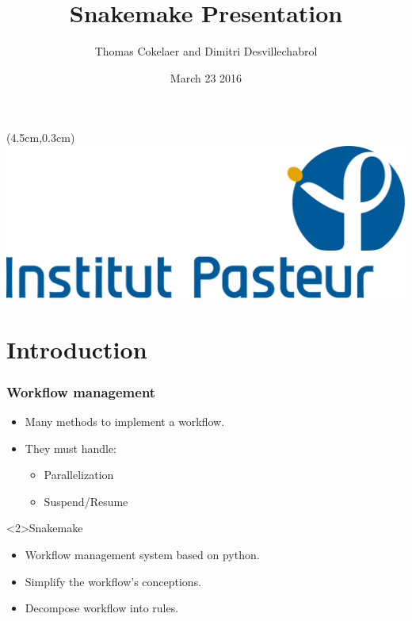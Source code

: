 \documentclass{beamer}
\title{Snakemake Presentation}
\author[T.Cokelaer \& D.Desvillechabrol]{Thomas Cokelaer and Dimitri Desvillechabrol}
\institute{Institut Pasteur}
\date{March 23 2016}
\begin{document}

\begin{frame}[plain]
    \titlepage
    \begin{textblock*}{5cm}(4.5cm,0.3cm)
        \includegraphics[scale=0.09]{Institut_Pasteur.png}
    \end{textblock*}
\end{frame}


\section{Introduction}

\begin{frame}
    \frametitle{Workflow management}
    \begin{itemize}
        \item Many methods to implement a workflow.
        \item They must handle:
            \begin{itemize}
                \item Parallelization
                \item Suspend/Resume
            \end{itemize}
    \end{itemize}
    \begin{block}<2>{Snakemake}
        \begin{itemize}
            \item Workflow management system based on python.
            \item Simplify the workflow's conceptions.
            \item Decompose workflow into rules.
        \end{itemize} 
    \end{block}
\end{frame}
\end{document}
